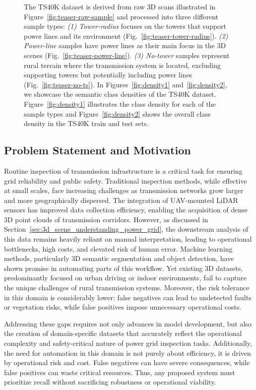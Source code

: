 \begin{figure}[ht]
      \caption[TS40K dataset overview]{The TS40K dataset is derived from raw 3D scans illustrated in Figure~\ref{fig:teaser-raw-sample} and processed into three different sample types: \textit{(1) Tower-radius} focuses on the towers that support power lines and its environment (Fig.~\ref{fig:teaser-tower-radius}). \textit{(2) Power-line} samples have power lines as their main focus in the 3D scenes (Fig.~\ref{fig:teaser-power-line}). \textit{(3) No-tower} samples represent rural terrain where the transmission system is located, excluding supporting towers but potentially including power lines (Fig.~\ref{fig:teaser-no-ts}).
            In Figures~\ref{fig:density1} and~\ref{fig:density2}, we showcase the semantic
            class densities of the TS40K dataset. Figure~\ref{fig:density1} illustrates the
            class density for each of the sample types and Figure~\ref{fig:density2} shows
            the overall class density in the TS40K train and test sets.} \label{fig:teaser}
\end{figure}

\subsection{Problem Statement and Motivation}

Routine inspection of transmission infrastructure is a critical task for
ensuring grid reliability and public safety. Traditional inspection methods,
while effective at small scales, face increasing challenges as transmission
networks grow larger and more geographically dispersed. The integration of
UAV-mounted LiDAR sensors has improved data collection efficiency, enabling the
acquisition of dense 3D point clouds of transmission corridors. However, as
discussed in Section~\ref{sec:3d_scene_understanding_power_grid}, the
downstream analysis of this data remains heavily reliant on manual
interpretation, leading to operational bottlenecks, high costs, and elevated
risk of human error.
%
Machine learning methods, particularly 3D semantic segmentation and object
detection, have shown promise in automating parts of this workflow. Yet
existing 3D datasets, predominantly focused on urban driving or indoor
environments, fail to capture the unique challenges of rural transmission
systems. Moreover, the risk tolerance in this domain is considerably lower:
false negatives can lead to undetected faults or vegetation risks, while false
positives impose unnecessary operational costs.

Addressing these gaps requires not only advances in model development, but also
the creation of domain-specific datasets that accurately reflect the
operational complexity and safety-critical nature of power grid inspection
tasks.
%
Additionally, the need for automation in this domain is not purely about
efficiency, it is driven by operational risk and cost. False negatives can have
severe consequences, while false positives can waste critical resources. Thus,
any proposed system must prioritize recall without sacrificing robustness or
operational viability.

